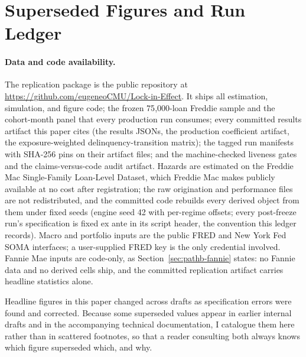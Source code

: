 \documentclass[12pt]{article}
\begin{document}
\newpage
\appendix

\section{Superseded Figures and Run Ledger}\label{app:ledger}

\paragraph{Data and code availability.} The replication package is the public repository at \url{https://github.com/eugeneoCMU/Lock-in-Effect}. It ships all estimation, simulation, and figure code; the frozen 75{,}000-loan Freddie sample and the cohort-month panel that every production run consumes; every committed results artifact this paper cites (the results JSONs, the production coefficient artifact, the exposure-weighted delinquency-transition matrix); the tagged run manifests with SHA-256 pins on their artifact files; and the machine-checked liveness gates and the claims-versus-code audit artifact. Hazards are estimated on the Freddie Mac Single-Family Loan-Level Dataset, which Freddie Mac makes publicly available at no cost after registration; the raw origination and performance files are not redistributed, and the committed code rebuilds every derived object from them under fixed seeds (engine seed 42 with per-regime offsets; every post-freeze run's specification is fixed ex ante in its script header, the convention this ledger records). Macro and portfolio inputs are the public FRED and New York Fed SOMA interfaces; a user-supplied FRED key is the only credential involved. Fannie Mae inputs are code-only, as Section~\ref{sec:pathb-fannie} states: no Fannie data and no derived cells ship, and the committed replication artifact carries headline statistics alone.

Headline figures in this paper changed across drafts as specification errors were found and corrected. Because some superseded values appear in earlier internal drafts and in the accompanying technical documentation, I catalogue them here rather than in scattered footnotes, so that a reader consulting both always knows which figure superseded which, and why.
\end{document}
